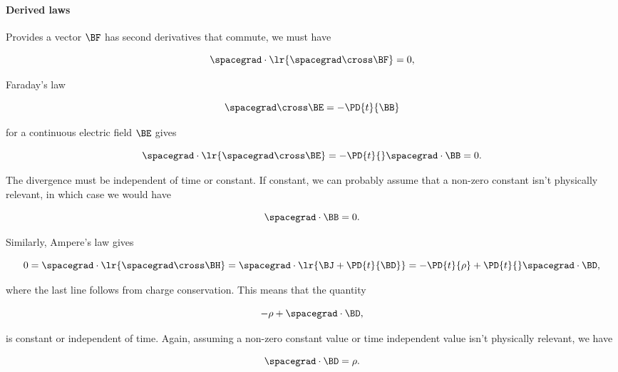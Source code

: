 \paragraph{Derived laws}

Provides a vector \( \BF \) has second derivatives that commute, we must have

\begin{dmath}\label{eqn:uwavesLecture1:440}
\spacegrad \cdot \lr{ \spacegrad \cross \BF } = 0,
\end{dmath}

Faraday's law

\begin{dmath}\label{eqn:uwavesLecture1:460}
\spacegrad \cross \BE = -\PD{t}{\BB}
\end{dmath}

for a continuous electric field \( \BE \) gives

\begin{dmath}\label{eqn:uwavesLecture1:480}
\spacegrad \cdot \lr{ \spacegrad \cross \BE } = -\PD{t}{} \spacegrad \cdot \BB = 0.
\end{dmath}

The divergence must be independent of time or constant.  If constant, we can probably assume that a non-zero constant isn't physically relevant, in which case we would have

\begin{dmath}\label{eqn:uwavesLecture1:500}
\spacegrad \cdot \BB = 0.
\end{dmath}

Similarly, Ampere's law gives

\begin{dmath}\label{eqn:uwavesLecture1:520}
0 = \spacegrad \cdot \lr{ \spacegrad \cross \BH } 
= \spacegrad \cdot \lr{ \BJ + \PD{t}{\BD} }
= - \PD{t}{\rho} + \PD{t}{} \spacegrad \cdot \BD,
\end{dmath}

where the last line follows from charge conservation.  This means that the quantity

\begin{dmath}\label{eqn:uwavesLecture1:540}
-\rho + \spacegrad \cdot \BD,
\end{dmath}

is constant or independent of time.  Again, assuming a non-zero constant value or time independent value isn't physically relevant, we have

\begin{dmath}\label{eqn:uwavesLecture1:560}
\spacegrad \cdot \BD = \rho.
\end{dmath}


